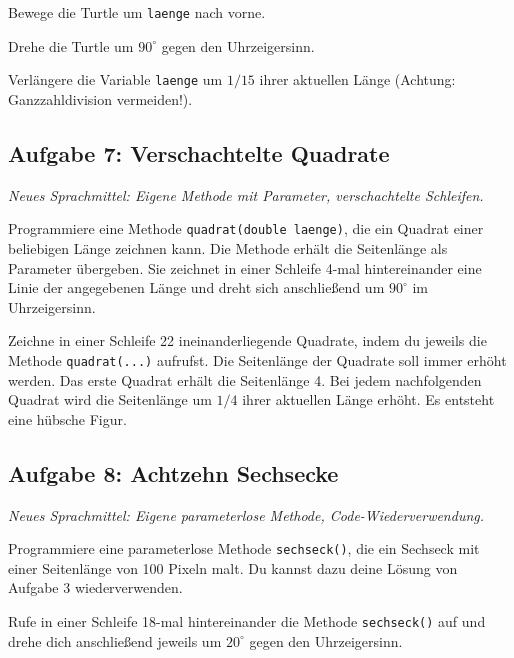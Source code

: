\begin{compactitem}
\item Bewege die Turtle um \verb|laenge| nach vorne.
\item Drehe die Turtle um $90^\circ$ gegen den Uhrzeigersinn.
\item Verlängere die Variable \verb|laenge| um $1/15$ ihrer aktuellen Länge
(Achtung: Ganzzahldivision vermeiden!).
\end{compactitem}


\subsection{Aufgabe 7: Verschachtelte Quadrate \tagPflicht}
\noindent \emph{Neues Sprachmittel: Eigene Methode mit Parameter, verschachtelte Schleifen.}

\begin{compactenum}[a)]
\item Programmiere eine Methode \verb|quadrat(double laenge)|, die ein Quadrat
einer beliebigen Länge zeichnen kann. Die Methode erhält die Seitenlänge als
Parameter übergeben. Sie zeichnet in einer Schleife 4-mal hintereinander eine
Linie der angegebenen Länge und dreht sich anschließend um $90^\circ$ im
Uhrzeigersinn.

\item Zeichne in einer Schleife 22 ineinanderliegende Quadrate, indem du
jeweils die Methode \verb|quadrat(...)| aufrufst. Die Seitenlänge der Quadrate soll
immer erhöht werden. Das erste Quadrat erhält die Seitenlänge 4. Bei jedem
nachfolgenden Quadrat wird die Seitenlänge um $1/4$ ihrer aktuellen Länge
erhöht. Es entsteht eine hübsche Figur.
\end{compactenum}


\subsection{Aufgabe 8: Achtzehn Sechsecke \tagZusatz}
\noindent \emph{Neues Sprachmittel: Eigene parameterlose Methode, Code-Wiederverwendung.}

\begin{compactenum}[a)]
\item Programmiere eine parameterlose Methode \verb|sechseck()|, die ein
Sechseck mit einer Seitenlänge von 100 Pixeln malt. Du kannst dazu deine Lösung
von Aufgabe 3 wiederverwenden.

\item Rufe in einer Schleife 18-mal hintereinander die Methode \verb|sechseck()|
auf und drehe dich anschließend jeweils um $20^\circ$ gegen den Uhrzeigersinn.
\end{compactenum}


